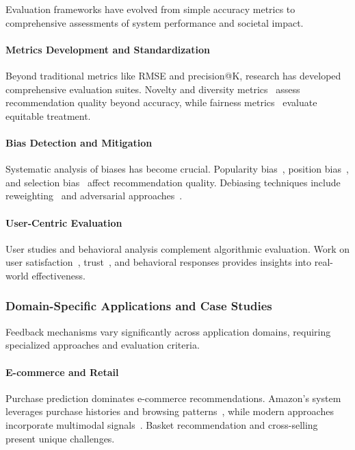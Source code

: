 Evaluation frameworks have evolved from simple accuracy metrics to comprehensive assessments of system performance and societal impact.

\paragraph{Metrics Development and Standardization}
Beyond traditional metrics like RMSE and precision@K, research has developed comprehensive evaluation suites. Novelty and diversity metrics~\cite{castells2011novelty} assess recommendation quality beyond accuracy, while fairness metrics~\cite{ge2020understanding} evaluate equitable treatment.

\paragraph{Bias Detection and Mitigation}
Systematic analysis of biases has become crucial. Popularity bias~\cite{abdollahpouri2019unfairness}, position bias~\cite{wang2021user}, and selection bias~\cite{schnabel2016recommendations} affect recommendation quality. Debiasing techniques include reweighting~\cite{wang2021user} and adversarial approaches~\cite{zehlike2020reducing}.

\paragraph{User-Centric Evaluation}
User studies and behavioral analysis complement algorithmic evaluation. Work on user satisfaction~\cite{knijnenburg2012explaining}, trust~\cite{pu2011user}, and behavioral responses provides insights into real-world effectiveness.

\subsubsection{Domain-Specific Applications and Case Studies}

Feedback mechanisms vary significantly across application domains, requiring specialized approaches and evaluation criteria.

\paragraph{E-commerce and Retail}
Purchase prediction dominates e-commerce recommendations. Amazon's system leverages purchase histories and browsing patterns~\cite{linden2003amazon}, while modern approaches incorporate multimodal signals~\cite{covington2016deep}. Basket recommendation and cross-selling present unique challenges.

